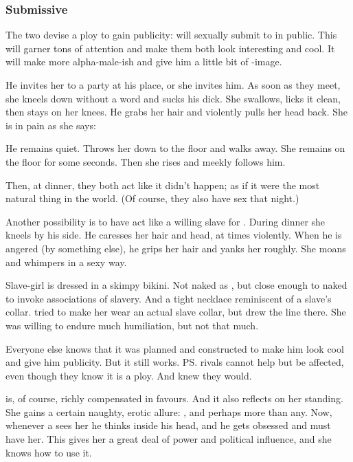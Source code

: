 \subsubsection{Submissive \Cishiel}
The two devise a ploy to gain publicity: 
\Cishiel{} will sexually submit to \Dasteron{} in public. 
This will garner tons of attention and make them both look interesting and cool. 
It will make \Dasteron{} more alpha-male-ish and give him a little bit of \Zachirah-image. 

He invites her to a party at his place, or she invites him. 
As soon as they meet, she kneels down without a word and sucks his dick. 
She swallows, licks it clean, then stays on her knees. 
He grabs her hair and violently pulls her head back. 
She is in pain as she says: 

He remains quiet. 
Throws her down to the floor and walks away. 
She remains on the floor for some seconds. 
Then she rises and meekly follows him. 

Then, at dinner, they both act like it didn't happen;
as if it were the most natural thing in the world. 
(Of course, they also have sex that night.)

Another possibility is to have \Cishiel{} act like a willing slave for \Dasteron. 
During dinner she kneels by his side. 
He caresses her hair and head, at times violently. 
When he is angered (by something else), he grips her hair and yanks her roughly. 
She moans and whimpers in a sexy way. 

Slave-girl \Cishiel{} is dressed in a skimpy bikini. 
Not naked as , but close enough to naked to invoke associations of slavery. 
And a tight necklace reminiscent of a slave's collar. 
\Dasteron{} tried to make her wear an actual slave collar, but \Cishiel{} drew the line there. 
She was willing to endure much humiliation, but not that much. 

Everyone else knows that it was planned and constructed to make him look cool and give him publicity. 
But it still works. 
\ps{\Dasteron} rivals cannot help but be affected, even though they know it is a ploy. 
And \Dasteron{} knew they would. 

\Cishiel{} is, of course, richly compensated in favours. 
And it also reflects on her standing. 
She gains a certain naughty, erotic allure: 
, and \Mystraacht{} perhaps more than any.
Now, whenever a \resphan{} sees her he thinks  inside his head, and he gets obsessed and must have her. 
This gives her a great deal of power and political influence, and she knows how to use it. 

